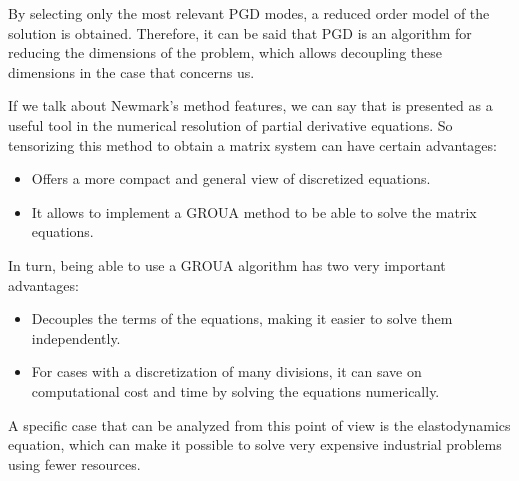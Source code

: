 By selecting only the most relevant PGD modes, a reduced order model of the solution is obtained. Therefore, it can be said that PGD is an algorithm for reducing the dimensions of the problem, which allows decoupling these dimensions in the case that concerns us.



 If we talk about Newmark's method features, we can say that is presented as a useful tool in the numerical resolution of partial derivative equations. So tensorizing this method to obtain a matrix system can have certain advantages:

\begin{itemize}

    \item Offers a more compact and general view of discretized equations.
    
    \item  It allows to implement a GROUA method to be able to solve the matrix equations.
    
\end{itemize}  

In turn, being able to use a GROUA algorithm has two very important advantages:

\begin{itemize}
    
    \item Decouples the terms of the equations, making it easier to solve them independently.
    
    \item For cases with a discretization of many divisions, it can save on computational cost and time by solving the equations numerically.


\end{itemize}

A specific case that can be analyzed from this point of view is the elastodynamics equation, which can make it possible to solve very expensive industrial problems using fewer resources.